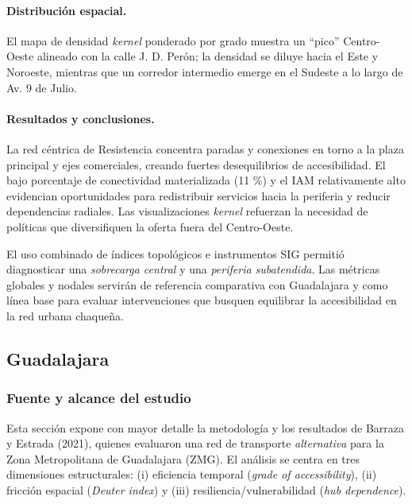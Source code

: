 \documentclass[openany]{book}
\begin{document}
		\paragraph{Distribución espacial.}
		El mapa de densidad \emph{kernel} ponderado por grado muestra un “pico” Centro-Oeste alineado con la calle J. D. Perón; la densidad se diluye hacia el Este y Noroeste, mientras que un corredor intermedio emerge en el Sudeste a lo largo de Av. 9 de Julio.

		\paragraph{Resultados y conclusiones.}
		La red céntrica de Resistencia concentra paradas y conexiones en torno a la plaza principal y ejes comerciales, creando fuertes desequilibrios de accesibilidad. El bajo porcentaje de conectividad materializada (11 \%) y el IAM relativamente alto evidencian oportunidades para redistribuir servicios hacia la periferia y reducir dependencias radiales. Las visualizaciones \emph{kernel} refuerzan la necesidad de políticas que diversifiquen la oferta fuera del Centro-Oeste.

		\bigskip

		El uso combinado de índices topológicos e instrumentos SIG permitió diagnosticar una \emph{sobrecarga central} y una \emph{periferia subatendida}. Las métricas globales y nodales servirán de referencia comparativa con Guadalajara y como línea base para evaluar intervenciones que busquen equilibrar la accesibilidad en la red urbana chaqueña.

	\subsection{Guadalajara}
		\label{sec:guadalajara}

		\subsubsection*{Fuente y alcance del estudio}
		Esta sección expone con mayor detalle la metodología y los resultados de Barraza y Estrada (2021), quienes evaluaron una red de transporte \emph{alternativa} para la Zona Metropolitana de Guadalajara (ZMG). El análisis se centra en tres dimensiones estructurales: (i) eficiencia temporal (\textit{grade of accessibility}), (ii) fricción espacial (\textit{Deuter index}) y (iii) resiliencia/vulnerabilidad (\textit{hub dependence}).
\end{document}
